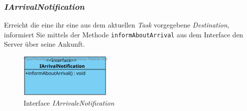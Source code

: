 	\subsubsection{\textit{IArrivalNotification}}
	Erreicht die  eine ihr eine aus dem aktuellen \textit{Task} vorgegebene \textit{Destination}, informiert Sie mittels der Methode \texttt{informAboutArrival} aus dem Interface  den Server über seine Ankunft.
	\begin{figure}[H]
	\centering
	\includegraphics[width=0.4\textwidth]{img/2-Entwurf-3-IArrivalNotification}
	\caption{Interface \emph{IArrivaleNotification}}
	\label{IArrivaleNotification}
	\end{figure}
